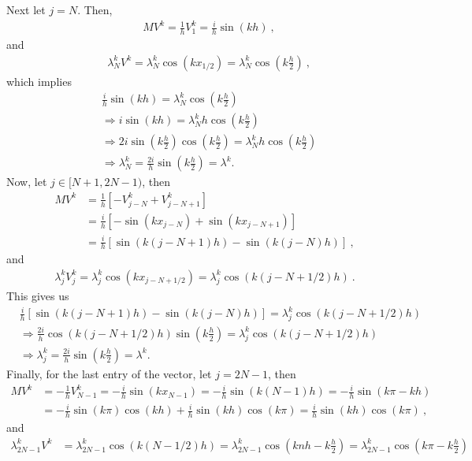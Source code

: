 \begin{enumerate}
Next let $j = N$. Then,
\begin{align*}
& MV^k = \frac{1}{h}V_1^k = \frac{i}{h}\sin(kh)~,
\end{align*}
and
\begin{align*}
& \lambda_N^kV^k = \lambda^k_N\cos(kx_{1/2}) = \lambda^k_N\cos\left(k\frac{h}{2}\right)~,
\end{align*}
which implies
\begin{align*}
& \frac{i}{h}\sin(kh) = \lambda^k_N\cos\left(k\frac{h}{2}\right) \\
& \Rightarrow i\sin(kh) = \lambda^k_Nh\cos\left(k\frac{h}{2}\right) \\
& \Rightarrow 2i\sin\left(k\frac{h}{2}\right)\cos\left(k\frac{h}{2}\right) = \lambda^k_Nh \cos\left(k\frac{h}{2}\right) \\
& \Rightarrow \lambda^k_N =\frac{2i}{h}\sin\left(k\frac{h}{2}\right)=\lambda^k.
\end{align*}
Now, let $j \in [N+1,2N-1)$, then
\begin{align*}
MV^k &= \frac{1}{h}\left[-V_{j-N}^k + V_{j-N+1}^k \right]\\ 
&= \frac{i}{h}\left[-\sin\left(kx_{j-N}\right)+\sin\left(kx_{j-N+1}\right)\right] \\
& = \frac{i}{h}\left[\sin(k(j-N+1)h) - \sin(k(j-N)h)\right]~,
\end{align*}
and
\begin{align*}
\lambda^k_j V_j^k = \lambda^k_j\cos(kx_{j-N+1/2}) = \lambda^k_j \cos(k(j-N+1/2)h)~.
\end{align*}
This gives us
\begin{align*}
& \frac{i}{h}\left[\sin(k(j-N+1)h) - \sin(k(j-N)h)\right] = \lambda^k_j \cos(k(j-N+1/2)h) \\
& \Rightarrow \frac{2i}{h}\cos(k(j-N+1/2)h)\sin\left(k\frac{h}{2}\right) = \lambda^k_j \cos(k(j-N+1/2)h) \\
& \Rightarrow \lambda^k_j = \frac{2i}{h}\sin\left(k\frac{h}{2}\right)=\lambda^k.
\end{align*}
Finally, for the last entry of the vector, let $j= 2N-1$, then
\begin{align*}
MV^k & = -\frac{1}{h}V_{N-1}^k = -\frac{i}{h}\sin(kx_{N-1}) = -\frac{i}{h}\sin(k(N-1)h) = -\frac{i}{h}\sin(k\pi - kh) \\
& = -\frac{i}{h}\sin(k\pi)\cos(kh) + \frac{i}{h}\sin(kh)\cos(k\pi) = \frac{i}{h}\sin(kh)\cos(k\pi)~,
\end{align*}
and
\begin{align*}
\lambda^k_{2N-1}V^k &= \lambda^k_{2N-1}\cos(k(N-1/2)h) = \lambda^k_{2N-1}\cos\left(knh - k\frac{h}{2}\right) = \lambda^k_{2N-1}\cos\left(k\pi - k\frac{h}{2}\right) \\

\end{align*}
\end{enumerate}
